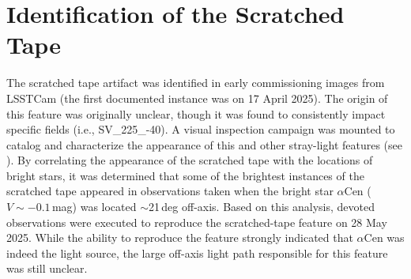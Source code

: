 \documentclass[SE,lsstdraft,authoryear,toc]{lsstdoc}
\begin{document}
\section{Identification of the Scratched Tape}
\label{sec:identification}

The scratched tape artifact was identified in early commissioning images from LSSTCam (the first documented instance was on 17 April 2025). The origin of this feature was originally unclear, though it was found to consistently impact specific fields (i.e., SV\_225\_-40). A visual inspection campaign was mounted to catalog and characterize the appearance of this and other stray-light features (see \citealt{SITCOMTN-160}). By correlating the appearance of the scratched tape with the locations of bright stars, it was determined that some of the brightest instances of the scratched tape appeared in observations taken when the bright star $\alpha$Cen ($V \sim -0.1$\,mag) was located $\sim$21\,deg off-axis. Based on this analysis, devoted observations were executed to reproduce the scratched-tape feature on 28 May 2025. While the ability to reproduce the feature strongly indicated that $\alpha$Cen was indeed the light source, the large off-axis light path responsible for this feature was still unclear.
\end{document}
